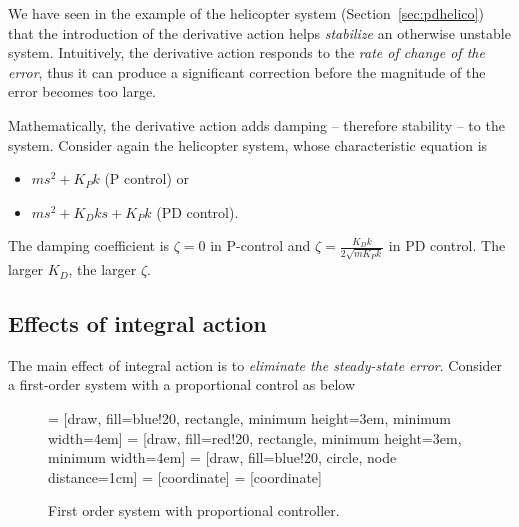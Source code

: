 \documentclass[a4paper,11pt]{report}
\theoremstyle{definition}
\begin{document}
We have seen in the example of the helicopter system
(Section~\ref{sec:pdhelico}) that the introduction of the derivative
action helps \emph{stabilize} an otherwise unstable
system. Intuitively, the derivative action responds to the \emph{rate
  of change of the error}, thus it can produce a significant
correction before the magnitude of the error becomes too large.

Mathematically, the derivative action adds damping -- therefore
stability -- to the system.  Consider again the helicopter system,
whose characteristic equation is
\begin{itemize}
\item $ms^2+K_Pk$ (P control) or
\item $ms^2+K_Dks+K_Pk$ (PD control).
\end{itemize}

The damping coefficient is $\zeta=0$ in P-control and $\zeta =
\frac{K_Dk}{2\sqrt{mK_Pk}}$ in PD control. The larger $K_D$, the larger
$\zeta$.


\subsection{Effects of integral action}

The main effect of integral action is to \emph{eliminate the
  steady-state error}. Consider a first-order system with a
proportional control as below
\begin{figure}[H]
  \label{fig:integral}
  \centering
   = [draw, fill=blue!20, rectangle, minimum height=3em, minimum width=4em]
   = [draw, fill=red!20, rectangle, minimum height=3em, minimum width=4em]
   = [draw, fill=blue!20, circle, node distance=1cm]
   = [coordinate]
   = [coordinate]
  \caption{First order system with proportional controller.}
\end{figure}
\end{document}
